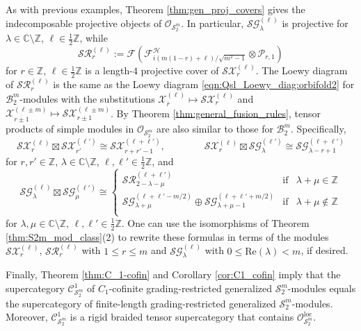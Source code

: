 \documentclass[11pt, reqno]{amsart}
\theoremstyle{definition}\newtheorem{defi}[thm]{Definition}
\theoremstyle{definition}\newtheorem{rem}[thm]{Remark}
\theoremstyle{definition}\newtheorem{exam}[thm]{Example}
\theoremstyle{definition}\newtheorem{assum}[thm]{Assumption}
\newcommand{\cB}{\mathcal{B}}
\newcommand{\cH}{\mathcal{H}}
\newcommand{\cR}{\mathcal{R}}
\newcommand{\cS}{\mathcal{S}}
\newcommand{\cX}{\mathcal{X}}
\newcommand{\cF}{\mathcal{F}}
\newcommand{\cO}{\mathcal{O}}
\newcommand{\cP}{\mathcal{P}}
\newcommand{\cC}{\mathcal{C}}
\newcommand{\cG}{\mathcal{G}}
\newcommand{\CC}{\mathbb{C}}
\newcommand{\ZZ}{\mathbb{Z}}
\newcommand{\tens}{\boxtimes}
\newcommand{\Oloc}{\cO^{\mathrm{loc}}}
\begin{document}
As with previous examples, Theorem \ref{thm:gen_proj_covers} gives the indecomposable projective objects of $\cO_{\cS_2^m}$. In particular, $\cS\cG^{(\ell)}_{\lambda}$ is projective for $\lambda\in\CC\setminus\ZZ$, $\ell\in\frac{1}{2}\ZZ$, while 
\begin{equation*}
\cS\mathcal{R}_{r}^{(\ell)}:=\cF\left(\cF^\cH_{i(m(1-r)+\ell)/\sqrt{m^2-1}}\otimes\cP_{r,1}\right)
\end{equation*}
for $r\in\ZZ$, $\ell\in\frac{1}{2}\ZZ$ is a length-$4$ projective cover of $\cS\cX_r^{(\ell)}$. The Loewy diagram of $\cS\cR_r^{(\ell)}$ is the same as the Loewy diagram \eqref{eqn:Qsl_Loewy_diag:orbifold2} for $\cB_2^m$-modules with the substitutions $\cX_{\overline{r}}^{(\ell)}\mapsto\cS\cX_r^{(\ell)}$ and $\cX_{\overline{r\pm 1}}^{(\ell\pm m)}\mapsto\cS\cX_{r\pm 1}^{(\ell\pm m)}$. By Theorem \ref{thm:general_fusion_rules},  tensor products of simple modules in $\cO_{\cS_2^m}$ are also similar to those for $\cB_2^m$. Specifically,
\begin{equation*}
\cS\cX_r^{(\ell)}\tens\cS\cX_{r'}^{(\ell')}\cong\cS\cX_{r+r'-1}^{(\ell+\ell')},\qquad\qquad\cS\cX_r^{(\ell)}\tens\cS\cG_\lambda^{(\ell')}\cong \cS\cG_{\lambda-r+1}^{(\ell+\ell')}
\end{equation*}
for $r,r'\in\ZZ$, $\lambda\in\CC\setminus\ZZ$, $\ell,\ell'\in\frac{1}{2}\ZZ$, and
\begin{equation*}
\cS\cG_\lambda^{(\ell)}\tens\cS\cG_\mu^{(\ell')}\cong\left\lbrace\begin{array}{lll}
\cS\cR_{2-\lambda-\mu}^{(\ell+\ell')} & \text{if} & \lambda+\mu\in\ZZ\\
\cS\cG_{\lambda+\mu}^{(\ell+\ell'-m/2)}\oplus\cS\cG_{\lambda+\mu-1}^{(\ell+\ell'+m/2)} & \text{if} & \lambda+\mu\notin\ZZ\\
\end{array}\right.
\end{equation*}
for $\lambda,\mu\in\CC\setminus\ZZ$, $\ell,\ell'\in\frac{1}{2}\ZZ$. One can use the isomorphisms of Theorem \ref{thm:S2m_mod_class}(2) to rewrite these formulas in terms of the modules $\cS\cX_r^{(\ell)}$, $\cS\cR_r^{(\ell)}$ with $1\leq r\leq m$ and $\cS\cG_\lambda^{(\ell)}$ with $0\leq\mathrm{Re}(\lambda)<m$, if desired.

Finally, Theorem \ref{thm:C_1-cofin} and Corollary \ref{cor:C1_cofin} imply that the supercategory $\cC_{\cS_2^m}^1$ of $C_1$-cofinite grading-restricted generalized $\cS_2^m$-modules equals the supercategory of finite-length grading-restricted generalized $\cS_2^m$-modules. Moreover, $\cC^1_{\cS_2^m}$ is a rigid braided tensor supercategory that contains $\Oloc_{\cS_2^m}$. 
\end{document}
